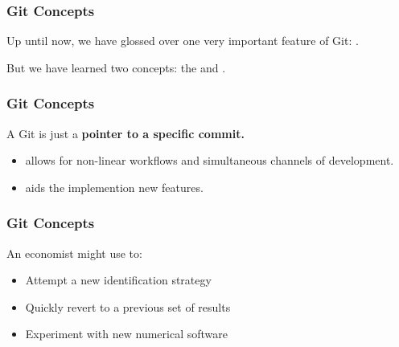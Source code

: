 \begin{frame}[c]\frametitle{Git Concepts}
	Up until now, we have glossed over one very important feature
	of Git: . 

	\vspace{1cm}
	But we have learned two concepts: 
	the  and 
	. 
\end{frame}

\begin{frame}[c]\frametitle{Git Concepts}
	A Git  is just a
	\textbf{pointer to a specific commit.}

	\begin{itemize}
		\item allows for non-linear workflows
		and simultaneous channels of development.
		\item aids the implemention new features.
	\end{itemize}

\end{frame}

\begin{frame}[c]\frametitle{Git Concepts}
	An economist might use  to:

	\begin{itemize}
		\item Attempt a new identification strategy
		\item Quickly revert to a previous set of results
		\item Experiment with new numerical software
	\end{itemize}
\end{frame}

